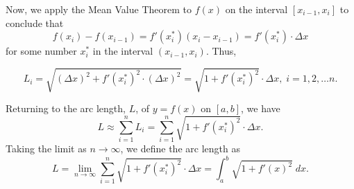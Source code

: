 \documentclass[handout]{ximera}
\begin{document}
Now, we apply the Mean Value Theorem to $f(x)$ on the interval $[x_{i-1}, x_i]$ to conclude that
\[
f(x_i) -f(x_{i-1})  = f'(x_i^*)(x_i - x_{i-1}) = f'(x_i^*) \cdot \Delta x
\]
for some number $x_i^*$ in the interval $(x_{i -1}, x_i)$. Thus,

\[
L_i = \sqrt{ (\Delta x)^2 + f'(x_i^*)^2 \cdot (\Delta x)^2} = \sqrt{ 1 + f'(x_i^*)^2 }\cdot \Delta x, \; i = 1, 2, \ldots n.
\]

Returning to the arc length, $L$, of $ y = f(x)$ on $[a,b]$, we have
\[
L \approx \sum_{i=1}^n L_i = \sum_{i=1}^n   \sqrt{1 + f'(x_i^*)^2} \cdot \Delta x.
\]
Taking the limit as $n \to \infty$, we define the arc length as 
\[
L = \lim_{n \to \infty} \sum_{i=1}^n   \sqrt{1 + f'(x_i^*)^2} \cdot \Delta x = \int_a^b \sqrt{1 + f'(x)^2} \; dx.
\]
\end{document}
